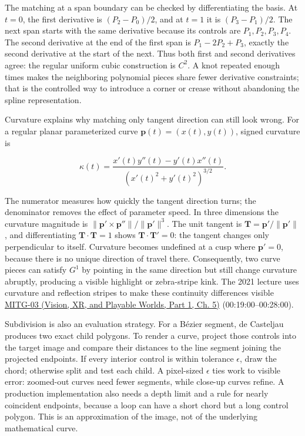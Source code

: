 The matching at a span boundary can be checked by differentiating the basis. At \(t=0\), the first derivative is \((P_2-P_0)/2\), and at \(t=1\) it is \((P_3-P_1)/2\). The next span starts with the same derivative because its controls are \(P_1,P_2,P_3,P_4\). The second derivative at the end of the first span is \(P_1-2P_2+P_3\), exactly the second derivative at the start of the next. Thus both first and second derivatives agree: the regular uniform cubic construction is \(C^2\). A knot repeated enough times makes the neighboring polynomial pieces share fewer derivative constraints; that is the controlled way to introduce a corner or crease without abandoning the spline representation.

Curvature explains why matching only tangent direction can still look wrong. For a regular planar parameterized curve \(\boldsymbol{p}(t)=(x(t),y(t))\), signed curvature is

\[
\kappa(t)=\frac{x'(t)y''(t)-y'(t)x''(t)}
{\left(x'(t)^2+y'(t)^2\right)^{3/2}}.
\]

The numerator measures how quickly the tangent direction turns; the denominator removes the effect of parameter speed. In three dimensions the curvature magnitude is \(\|\boldsymbol{p}'\times\boldsymbol{p}''\|/\|\boldsymbol{p}'\|^3\). The unit tangent is \(\boldsymbol{T}=\boldsymbol{p}'/\|\boldsymbol{p}'\|\), and differentiating \(\boldsymbol{T}\cdot\boldsymbol{T}=1\) shows \(\boldsymbol{T}\cdot\boldsymbol{T}'=0\): the tangent changes only perpendicular to itself. Curvature becomes undefined at a cusp where \(\boldsymbol{p}'=0\), because there is no unique direction of travel there. Consequently, two curve pieces can satisfy \(G^1\) by pointing in the same direction but still change curvature abruptly, producing a visible highlight or zebra-stripe kink. The 2021 lecture uses curvature and reflection stripes to make these continuity differences visible \href{../07-Vision-XR-and-Playable-Worlds-P01/main.pdf\#nameddest=04-visual-computing-ii-ch036-mitg-03---curves-and-surfaces}{MITG-03 (Vision, XR, and Playable Worlds, Part 1, Ch. 5)} (00:19:00--00:28:00).

Subdivision is also an evaluation strategy. For a Bézier segment, de Casteljau produces two exact child polygons. To render a curve, project those controls into the target image and compare their distances to the line segment joining the projected endpoints. If every interior control is within tolerance \(\epsilon\), draw the chord; otherwise split and test each child. A pixel-sized \(\epsilon\) ties work to visible error: zoomed-out curves need fewer segments, while close-up curves refine. A production implementation also needs a depth limit and a rule for nearly coincident endpoints, because a loop can have a short chord but a long control polygon. This is an approximation of the image, not of the underlying mathematical curve.

